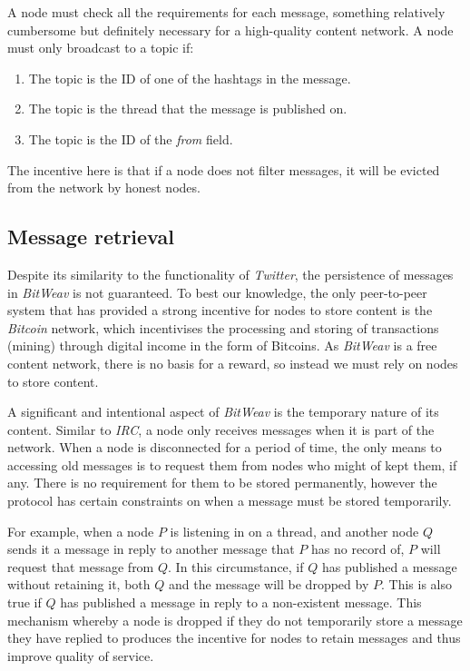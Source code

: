 \documentclass[10pt,a4paper,onecolumn]{article}
\begin{document}
A node must check all the requirements for each message, something relatively cumbersome but definitely necessary for a high-quality content network. A node must only broadcast to a topic if:
\begin{enumerate}
\item The topic is the ID of one of the hashtags in the message.
\item The topic is the thread that the message is published on.
\item The topic is the ID of the \emph{from} field. 
\end{enumerate}

The incentive here is that if a node does not filter messages, it will be evicted from the network by honest nodes.

\subsection{Message retrieval}
Despite its similarity to the functionality of \textit{Twitter}, the persistence of messages in \textit{BitWeav} is not guaranteed. To best our knowledge, the only peer-to-peer system that has provided a strong incentive for nodes to store content is the \textit{Bitcoin} network, which incentivises the processing and storing of transactions (mining) through digital income in the form of Bitcoins. As \textit{BitWeav} is a free content network, there is no basis for a reward, so instead we must rely on nodes to store content.

A significant and intentional aspect of \textit{BitWeav} is the temporary nature of its content. Similar to \textit{IRC}, a node only receives messages when it is part of the network. When a node is disconnected for a period of time, the only means to accessing old messages is to request them from nodes who might of kept them, if any. There is no requirement for them to be stored permanently, however the protocol has certain constraints on when a message must be stored temporarily.

For example, when a node $P$ is listening in on a thread, and another node $Q$ sends it a message in reply to another message that $P$ has no record of, $P$ will request that message from $Q$. In this circumstance, if $Q$ has published a message without retaining it, both $Q$ and the message will be dropped by $P$. This is also true if $Q$ has published a message in reply to a non-existent message. This mechanism whereby a node is dropped if they do not temporarily store a message they have replied to produces the incentive for nodes to retain messages and thus improve quality of service.
\end{document}
